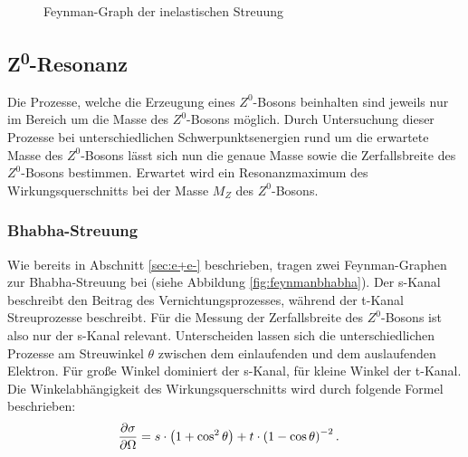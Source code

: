 \begin{figure}
	\centering
	\caption{Feynman-Graph der inelastischen Streuung}
	\label{fig:feynmaninelastisch}
\end{figure}

\subsection{Z\textsuperscript0-Resonanz}

Die Prozesse, welche die Erzeugung eines $Z^0$-Bosons beinhalten sind jeweils nur im Bereich um die Masse des $Z^0$-Bosons möglich. Durch Untersuchung dieser Prozesse bei unterschiedlichen Schwerpunktsenergien rund um die erwartete Masse des $Z^0$-Bosons lässt sich nun die genaue Masse sowie die Zerfallsbreite des $Z^0$-Bosons bestimmen. Erwartet wird ein Resonanzmaximum des Wirkungsquerschnitts bei der Masse $M_Z$ des $Z^0$-Bosons.

\subsubsection{Bhabha-Streuung}\label{sec:bhabha}

Wie bereits in Abschnitt \ref{sec:e+e-} beschrieben, tragen zwei Feynman-Graphen zur Bhabha-Streuung bei (siehe Abbildung \ref{fig:feynmanbhabha}). Der s-Kanal beschreibt den Beitrag des Vernichtungsprozesses, während der t-Kanal Streuprozesse beschreibt. Für die Messung der Zerfallsbreite des $Z^0$-Bosons ist also nur der s-Kanal relevant. Unterscheiden lassen sich die unterschiedlichen Prozesse am Streuwinkel $\theta$ zwischen dem einlaufenden und dem auslaufenden Elektron. Für große Winkel dominiert der s-Kanal, für kleine Winkel der t-Kanal. Die Winkelabhängigkeit des Wirkungsquerschnitts wird durch folgende Formel beschrieben:
\begin{align}
	\del[\sigma]{\Omega}&=s\cdot\left(1+\cos^2\theta\right)+t\cdot\left(1-\cos\theta\right)^{-2}\text{.}\label{eq:stkanal}
\end{align}


